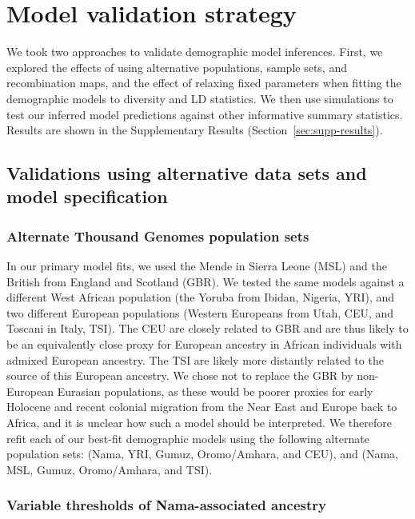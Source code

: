 \documentclass[]{article}
\begin{document}
\section{Model validation strategy}
\label{sec:validation_strategy}
We took two approaches to validate demographic model inferences. First, we
explored the effects of using alternative populations, sample sets, and
recombination maps, and the effect of relaxing fixed parameters when fitting
the demographic models to diversity and LD statistics. We then use simulations
to test our inferred model predictions against other informative summary
statistics. Results are shown in the Supplementary Results
(Section~\ref{sec:supp-results}).

\subsection{Validations using alternative data sets and model specification}
\label{sec:validation-data-models}

\subsubsection{Alternate Thousand Genomes population sets}

In our primary model fits, we used the Mende in Sierra Leone (MSL) and the
British from England and Scotland (GBR). We tested the same models against a
different West African population (the Yoruba from Ibidan, Nigeria, YRI), and
two different European populations (Western Europeans from Utah, CEU, and
Toscani in Italy, TSI). The CEU are closely related to GBR and are thus likely
to be an equivalently close proxy for European ancestry in African individuals
with admixed European ancestry. The TSI are likely more distantly related to
the source of this European ancestry. We chose not to replace the GBR
by non-European Eurasian populations, as these would be poorer proxies for early
Holocene and recent colonial migration from the Near East and Europe back to
Africa, and it is unclear how such a model should be interpreted. We therefore
refit each of our best-fit demographic models using the following alternate
population sets: (Nama, YRI, Gumuz, Oromo/Amhara, and CEU), and (Nama, MSL,
Gumuz, Oromo/Amhara, and TSI).

\subsubsection{Variable thresholds of Nama-associated ancestry}
\end{document}
